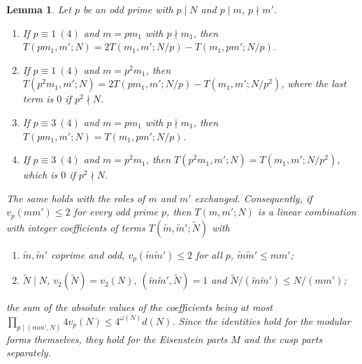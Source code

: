 \documentclass[11pt]{amsart}
\newtheorem{lemma}[theorem]{Lemma}
\theoremstyle{remark}
\begin{document}
\begin{lemma}\label{lem:reduce}
Let $p$ be an odd prime with $p\mid N$ and $p\mid m$, $p\nmid m'$.
\begin{enumerate}
\item[(i)] If $p\equiv1\ (4)$ and $m=pm_1$ with $p\nmid m_1$, then $T(pm_1,m';N)=2T(m_1,m';N/p)-T(m_1,pm';N/p)$.
\item[(ii)] If $p\equiv1\ (4)$ and $m=p^2m_1$, then $T(p^2m_1,m';N)=2T(pm_1,m';N/p)-T(m_1,m';N/p^2)$, where the last term is $0$ if $p^2\nmid N$.
\item[(iii)] If $p\equiv3\ (4)$ and $m=pm_1$ with $p\nmid m_1$, then $T(pm_1,m';N)=T(m_1,pm';N/p)$.
\item[(iv)] If $p\equiv3\ (4)$ and $m=p^2m_1$, then $T(p^2m_1,m';N)=T(m_1,m';N/p^2)$, which is $0$ if $p^2\nmid N$.
\end{enumerate}
The same holds with the roles of $m$ and $m'$ exchanged. Consequently, if $v_p(mm')\le2$ for every odd prime $p$, then $T(m,m';N)$ is a linear combination with integer coefficients of terms $T(\tilde m,\tilde m';\tilde N)$ with
\begin{enumerate}[label=\textup{(\alph*)},leftmargin=2.5em]
\item $\tilde m,\tilde m'$ coprime and odd, $v_p(\tilde m\tilde m')\le 2$ for all $p$, $\tilde m\tilde m'\le mm'$;
\item $\tilde N\mid N$, $v_2(\tilde N)=v_2(N)$, $(\tilde m\tilde m',\tilde N)=1$ and $\tilde N/(\tilde m\tilde m')\le N/(mm')$;
\end{enumerate}
the sum of the absolute values of the coefficients being at most $\prod_{p\mid(mm',N)}4v_p(N)\le 4^{\omega(N)}d(N)$. Since the identities hold for the modular forms themselves, they hold for the Eisenstein parts $M$ and the cusp parts separately.
\end{lemma}
\end{document}
